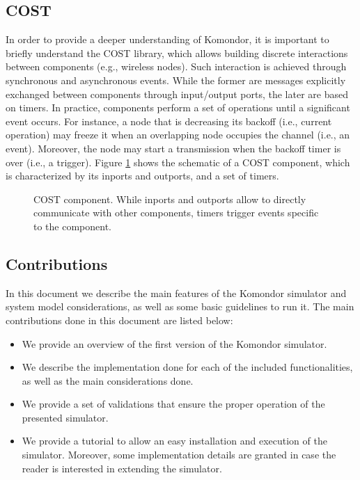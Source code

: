 \documentclass[a4paper]{article}
\begin{document}
	\subsection{COST}
	\label{section:cost}
	In order to provide a deeper understanding of Komondor, it is important to briefly understand the COST library, which allows building discrete interactions between components (e.g., wireless nodes). Such interaction is achieved through synchronous and asynchronous events. While the former are messages explicitly exchanged between components through input/output ports, the later are based on timers. In practice, components perform a set of operations until a significant event occurs. For instance, a node that is decreasing its backoff (i.e., current operation) may freeze it when an overlapping node occupies the channel (i.e., an event). Moreover, the node may start a transmission when the backoff timer is over (i.e., a trigger). Figure \ref{fig:cost} shows the schematic of a COST component, which is characterized by its inports and outports, and a set of timers. 
	\begin{figure}[h!]
		\centering
		\caption{COST component. While inports and outports allow to directly communicate with other components, timers trigger events specific to the component.}
		\label{fig:cost}
	\end{figure}	
	
	\subsection{Contributions}
	In this document we describe the main features of the Komondor simulator and system model considerations, as well as some basic guidelines to run it. The main contributions done in this document are listed below:
	\begin{itemize}
		\item We provide an overview of the first version of the Komondor simulator.
		\item We describe the implementation done for each of the included functionalities, as well as the main considerations done.
		\item We provide a set of validations that ensure the proper operation of the presented simulator.
		\item We provide a tutorial to allow an easy installation and execution of the simulator. Moreover, some implementation details are granted in case the reader is interested in extending the simulator.
	\end{itemize}	
	
\end{document}
